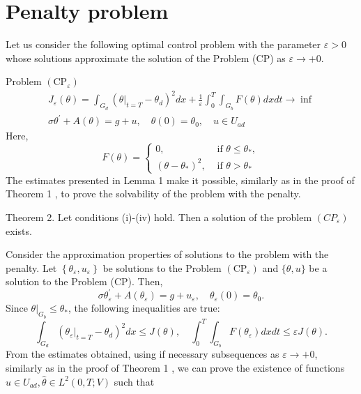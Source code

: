\documentclass[10pt]{article}
\begin{document}
\section{Penalty problem}
Let us consider the following optimal control problem with the parameter $\varepsilon>0$ whose solutions approximate the solution of the Problem (CP) as $\varepsilon \rightarrow+0$.

Problem $\left(\mathrm{CP}_{\varepsilon}\right)$
$$
\begin{gathered}
J_{\varepsilon}(\theta)=\int_{G_{d}}\left(\left.\theta\right|_{t=T}-\theta_{d}\right)^{2} d x+\frac{1}{\varepsilon} \int_{0}^{T} \int_{G_{b}} F(\theta) d x d t \rightarrow \inf \\
\sigma \theta^{\prime}+A(\theta)=g+u, \quad \theta(0)=\theta_{0}, \quad u \in U_{a d}
\end{gathered}
$$
Here,
$$
F(\theta)= \begin{cases}0, & \text { if } \theta \leq \theta_{*}, \\ \left(\theta-\theta_{*}\right)^{2}, & \text { if } \theta>\theta_{*}\end{cases}
$$
The estimates presented in Lemma 1 make it possible, similarly as in the proof of Theorem 1 , to prove the solvability of the problem with the penalty.

Theorem 2. Let conditions (i)-(iv) hold. Then a solution of the problem $\left(C P_{\varepsilon}\right)$ exists.

Consider the approximation properties of solutions to the problem with the penalty. Let $\left\{\theta_{\varepsilon}, u_{\varepsilon}\right\}$ be solutions to the Problem $\left(\mathrm{CP}_{\varepsilon}\right)$ and $\{\theta, u\}$ be a solution to the Problem (CP). Then,
$$
\sigma \theta_{\varepsilon}^{\prime}+A\left(\theta_{\varepsilon}\right)=g+u_{\varepsilon}, \quad \theta_{\varepsilon}(0)=\theta_{0} .
$$
Since $\left.\theta\right|_{G_{b}} \leq \theta_{*}$, the following inequalities are true:
$$
\int_{G_{d}}\left(\left.\theta_{\varepsilon}\right|_{t=T}-\theta_{d}\right)^{2} d x \leq J(\theta), \quad \int_{0}^{T} \int_{G_{b}} F\left(\theta_{\varepsilon}\right) d x d t \leq \varepsilon J(\theta) .
$$
From the estimates obtained, using if necessary subsequences as $\varepsilon \rightarrow+0$, similarly as in the proof of Theorem 1 , we can prove the existence of functions $\widehat{u} \in U_{a d}, \widehat{\theta} \in L^{2}(0, T ; V)$ such that
\end{document}
